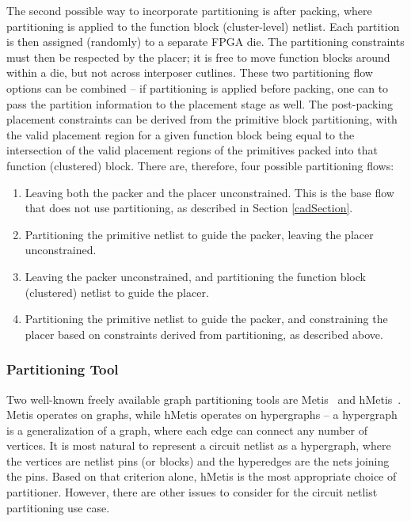 The second possible way to incorporate partitioning is after packing, where partitioning is applied to the function block (cluster-level) netlist. Each partition is then assigned (randomly) to a separate FPGA die. The partitioning constraints must then be respected by the placer; it is free to move function blocks around within a die, but not across interposer cutlines. These two partitioning flow options can be combined -- if partitioning is applied before packing, one can to pass the partition information to the placement stage as well. The post-packing placement constraints can be derived from the primitive block partitioning, with the valid placement region for a given function block being equal to the intersection of the valid placement regions of the primitives packed into that function (clustered) block. There are, therefore, four possible partitioning flows:

\begin{enumerate}
  \item Leaving both the packer and the placer unconstrained. This is the base flow that does not use partitioning, as described in Section \ref{cadSection}.
  \item Partitioning the primitive netlist to guide the packer, leaving the placer unconstrained.
  \item Leaving the packer unconstrained, and partitioning the function block (clustered) netlist to guide the placer.
  \item Partitioning the primitive netlist to guide the packer, and constraining the placer based on constraints derived from partitioning, as described above.
\end{enumerate}

\subsubsection{Partitioning Tool}
Two well-known freely available graph partitioning tools are Metis~\cite{karypis1998multilevelmetis} and hMetis~\cite{karypis1999multilevelhmetis}. Metis operates on graphs, while hMetis operates on hypergraphs -- a hypergraph is a generalization of a graph, where each edge can connect any number of vertices. It is most natural to represent a circuit netlist as a hypergraph, where the vertices are netlist pins (or blocks) and the hyperedges are the nets joining the pins. Based on that criterion alone, hMetis is the most appropriate choice of partitioner. However, there are other issues to consider for the circuit netlist partitioning use case.

